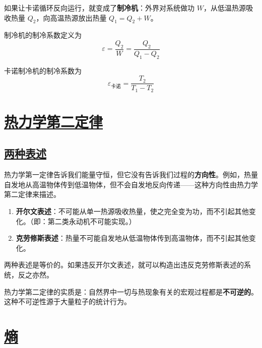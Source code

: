 如果让卡诺循环反向运行，就变成了\textbf{制冷机}：外界对系统做功 $W$，从低温热源吸收热量 $Q_2$，向高温热源放出热量 $Q_1 = Q_2 + W$。

\begin{definition}[制冷系数]
    制冷机的制冷系数定义为
    \begin{equation}
        \varepsilon = \frac{Q_2}{W} = \frac{Q_2}{Q_1 - Q_2}
    \end{equation}
\end{definition}

卡诺制冷机的制冷系数为
\begin{equation}
    \varepsilon_{\text{卡诺}} = \frac{T_2}{T_1 - T_2}
\end{equation}


\section{\protect\hyperlink{:}{热力学第二定律}}

\subsection{\protect\hyperlink{:}{两种表述}}

热力学第一定律告诉我们能量守恒，但它没有告诉我们过程的\textbf{方向性}。例如，热量自发地从高温物体传到低温物体，但不会自发地反向传递——这种方向性由热力学第二定律来描述。

\begin{theorem}[热力学第二定律]
    \begin{enumerate}
        \item \textbf{开尔文表述}：不可能从单一热源吸收热量，使之完全变为功，而不引起其他变化。（即：第二类永动机不可能实现。）
        \item \textbf{克劳修斯表述}：热量不可能自发地从低温物体传到高温物体，而不引起其他变化。
    \end{enumerate}
\end{theorem}

两种表述是等价的。如果违反开尔文表述，就可以构造出违反克劳修斯表述的系统，反之亦然。

\begin{remark}
    热力学第二定律的实质是：自然界中一切与热现象有关的宏观过程都是\textbf{不可逆的}。这种不可逆性源于大量粒子的统计行为。
\end{remark}


\section{\protect\hyperlink{:}{熵}}

